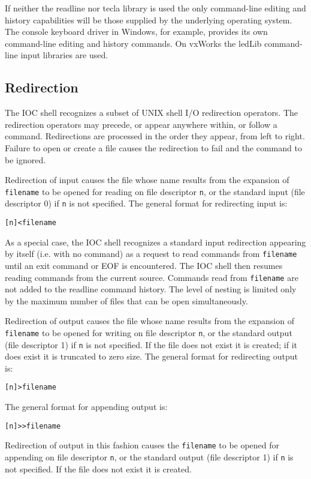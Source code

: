 If neither the readline nor tecla library is used the only command-line editing and history capabilities will be those 
supplied by the underlying operating system.  The console keyboard driver in Windows, for example, provides its own 
command-line editing and history commands.  On vxWorks the ledLib command-line input libraries are used.

\subsection{Redirection}

The IOC shell recognizes a subset of UNIX shell I/O redirection operators.  The redirection operators may precede, or 
appear anywhere within, or follow a command.  Redirections are processed in the order they appear, from left to right.   
Failure to open or create a file causes the redirection to fail and the command to be ignored.

Redirection of input causes the file whose name results from the  expansion  of  \verb|filename|  to  be  opened for reading on 
file descriptor \verb|n|, or the standard input (file descriptor 0) if \verb|n| is not specified.  The general format for redirecting input is:

\begin{verbatim}[n]<filename
\end{verbatim}As a special case, the IOC shell recognizes a standard input redirection appearing by itself (i.e. with no command) as a 
request to read commands from \verb|filename| until an exit command or EOF is encountered. The IOC shell then resumes 
reading commands from the current source. Commands read from \verb|filename| are not added to the readline command 
history. The level of nesting is limited only by the maximum number of files that can be open simultaneously.

Redirection of output causes the  file  whose  name  results from  the expansion of \verb|filename| to be opened for writing on 
file descriptor \verb|n|, or the standard output (file descriptor 1)  if \verb|n|  is  not  specified.   If  the  file  does not exist it is created; 
if it does exist it is truncated to zero size. The general format for redirecting output is:

\begin{verbatim}[n]>filename
\end{verbatim} The general format for appending output is:

\begin{verbatim}[n]>>filename
\end{verbatim}Redirection of output in this fashion causes the \verb|filename| to be opened for appending on file descriptor \verb|n|, or the 
standard output (file descriptor  1)  if \verb|n| is not specified.  If the file does not exist it is created.


